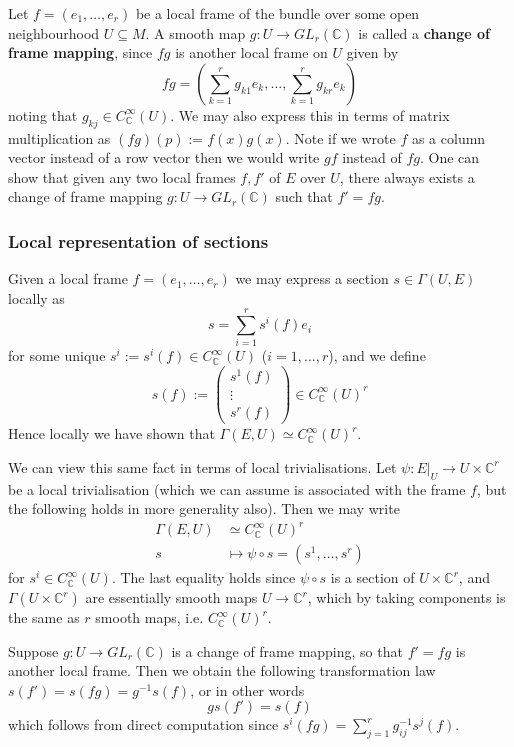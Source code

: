 \documentclass[a4paper]{article}
\theoremstyle{definition} \newtheorem*{definition}{Definition}
\theoremstyle{definition} \newtheorem*{definitions}{Definitions}
\theoremstyle{plain} \newtheorem{theorem}{Theorem}[section]
\theoremstyle{plain} \newtheorem{proposition}[theorem]{Proposition}
\theoremstyle{plain} \newtheorem{corollary}[theorem]{Corollary}
\theoremstyle{plain} \newtheorem{lemma}[theorem]{Lemma}
\theoremstyle{plain} \newtheorem{example}[theorem]{Example}
\newcommand{\defn}[1]{\textbf{#1}}
\newcommand{\complexnos}{\mathbb{C}}
\newcommand{\smoothCmaps}{C^\infty_\complexnos (U)}
\begin{document}
Let $f=(e_1,\ldots, e_r)$ be a local frame of the bundle over some open neighbourhood $U\subseteq M$. A smooth map $g:U\to GL_r(\complexnos)$ is called a \defn{change of frame mapping}, since $fg$ is another local frame on $U$ given by 
$$fg=(\sum_{k=1}^r g_{k1}e_k,\ldots, \sum_{k=1}^r g_{kr}e_k)$$
noting that $g_{kj}\in \smoothCmaps$. We may also express this in terms of matrix multiplication as $(fg)(p):=f(x)g(x)$. Note if we wrote $f$ as a column vector instead of a row vector then we would write $gf$ instead of $fg$. One can show that given any two local frames $f, f'$ of $E$ over $U$, there always exists a change of frame mapping $g:U\to GL_r(\complexnos)$ such that $f'=fg$. 

\subsubsection{Local representation of sections}
Given a local frame $f=(e_1,\ldots, e_r)$ we may express a section $s\in \Gamma(U, E)$ locally as
$$s=\sum_{i=1}^r s^i(f)e_i$$
for some unique $s^i:=s^i(f)\in \smoothCmaps$ ($i=1,\ldots, r$), and we define 
$$s(f):= \begin{pmatrix}s^1(f) \\ \vdots \\ s^r(f)\end{pmatrix} \in \smoothCmaps^r$$
Hence locally we have shown that $\Gamma(E, U) \simeq \smoothCmaps^r$.

We can view this same fact in terms of local trivialisations.  Let $\psi: E\vert_U \to U\times \complexnos^r$ be a local trivialisation (which we can assume is associated with the frame $f$,  but the following holds in more generality also).  Then we may write
\begin{align*}
\Gamma(E, U) & \simeq \smoothCmaps^r \\
s & \mapsto \psi\circ s = (s^1, \ldots,  s^r)
\end{align*}
for $s^i\in \smoothCmaps$.  
The last equality holds since $\psi\circ s$ is a section of $U\times \complexnos^r$,
and $\Gamma(U\times \complexnos^r)$ are essentially smooth maps $U\to \complexnos^r$, which by taking components is the same as $r$ smooth maps,  i.e.  $\smoothCmaps^r$.  

Suppose $g:U\to GL_r(\complexnos)$ is a change of frame mapping, so that $f'=fg$ is another local frame. Then we obtain the following transformation law $s(f')=s(fg)=g^{-1}s(f)$, or in other words
$$gs(f')=s(f)$$
which follows from direct computation since $s^i(fg)=\sum_{j=1}^r g_{ij}^{-1} s^j(f)$.
\end{document}
